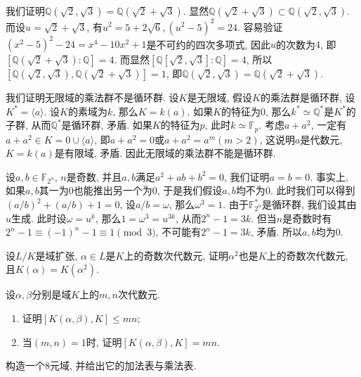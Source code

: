 \begin{eg}\label{sqrt(2)+sqrt(3)}
    我们证明$\mathbb{Q}(\sqrt{2},\sqrt{3})=\mathbb{Q}(\sqrt{2}+\sqrt{3})$.
    显然$\mathbb{Q}(\sqrt{2}+\sqrt{3})\subset\mathbb{Q}(\sqrt{2},\sqrt{3})$.
    而设$u=\sqrt{2}+\sqrt{3}$, 有$u^2=5+2\sqrt{6},(u^2-5)^2=24$.
    容易验证$(x^2-5)^2-24=x^4-10x^2+1$是不可约的四次多项式, 因此$u$的次数为$4$, 即$[\mathbb{Q}(\sqrt{2}+\sqrt{3}):\mathbb{Q}]=4$.
    而显然$[\mathbb{Q}[\sqrt{2},\sqrt{3}]:\mathbb{Q}]=4$, 所以$[\mathbb{Q}(\sqrt{2},\sqrt{3}),\mathbb{Q}(\sqrt{2}+\sqrt{3})]=1$, 即$\mathbb{Q}(\sqrt{2},\sqrt{3})=\mathbb{Q}(\sqrt{2}+\sqrt{3})$.
\end{eg}

\begin{eg}
    我们证明无限域的乘法群不是循环群.
    设$K$是无限域, 假设$K$的乘法群是循环群, 设$K^*=\langle a\rangle$.
    设$K$的素域为$k$, 那么$K=k(a)$.
    如果$K$的特征为$0$, 那么$k^*\simeq\mathbb{Q}^*$是$K^*$的子群, 从而$\mathbb{Q}^*$是循环群, 矛盾.
    如果$K$的特征为$p$, 此时$k\simeq\mathbb{F}_p$.
    考虑$a+a^2$, 一定有$a+a^2\in K=0\cup\langle a\rangle$, 即$a+a^2=0$或$a+a^2=a^m(m>2)$, 这说明$a$是代数元, $K=k(a)$是有限域, 矛盾.
    因此无限域的乘法群不能是循环群.
\end{eg}

\begin{eg}
    设$a,b\in\mathbb{F}_{2^n}$, $n$是奇数, 并且$a,b$满足$a^2+ab+b^2=0$, 我们证明$a=b=0$.
    事实上, 如果$a,b$其一为$0$也能推出另一个为$0$, 于是我们假设$a,b$均不为$0$.
    此时我们可以得到$(a/b)^2+(a/b)+1=0$, 设$a/b=\omega$, 那么$\omega^3=1$.
    由于$\mathbb{F}_{2^n}^*$是循环群, 我们设其由$u$生成.
    此时设$\omega=u^k$, 那么$1=\omega^3=u^{3k}$, 从而$2^n-1=3k$.
    但当$n$是奇数时有$2^n-1\equiv (-1)^n-1\equiv 1\pmod{3}$, 不可能有$2^n-1=3k$, 矛盾.
    所以$a,b$均为$0$.
\end{eg}

\begin{ex}
    设$L/K$是域扩张, $\alpha\in L$是$K$上的奇数次代数元, 证明$\alpha^2$也是$K$上的奇数次代数元, 且$K(\alpha)=K(\alpha^2)$.
\end{ex}

\begin{ex}
    设$\alpha,\beta$分别是域$K$上的$m,n$次代数元.
    \begin{enumerate}[(1)]
        \item 证明$[K(\alpha,\beta),K]\leq mn$;
        \item 当$(m,n)=1$时, 证明$[K(\alpha,\beta),K]=mn$.
    \end{enumerate}
\end{ex}

\begin{ex}
    构造一个$8$元域, 并给出它的加法表与乘法表.
\end{ex}